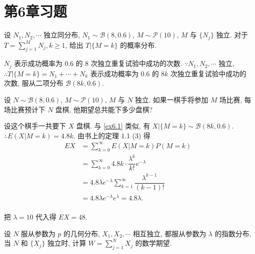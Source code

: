 \documentclass{ctexart}
\begin{document}
\section{第6章习题}
\addtocounter{exsection}{6}
\begin{exercise}[a]\label{ex6.1}
    设 $N_1,N_2,\cdots$ 独立同分布, $N_1\sim\mathcal{B}(8,0.6)$, $M\sim\mathcal{P}(10)$, $M$ 与 $\{N_j\}$ 独立. 对于 $T=\sum\limits_{j=1}^MN_j,k\geq1$, 给出 $T|\{M=k\}$ 的概率分布.
\end{exercise}
\begin{solution}
    $N_j$ 表示成功概率为 $0.6$ 的 $8$ 次独立重复试验中成功的次数. $\because N_1,N_2,\cdots$ 独立, $\therefore T|\{M=k\}=N_1+\cdots+N_k$ 表示成功概率为 $0.6$ 的 $8k$ 次独立重复试验中成功的次数, 服从二项分布 $\mathcal{B}(8k,0.6)$.
\end{solution}
\begin{exercise}%
    设 $N\sim\mathcal{B}(8,0.6)$, $M\sim\mathcal{P}(10)$, $M$ 与 $N$ 独立. 如果一棋手将参加 $M$ 场比赛, 每场比赛预计下 $N$ 盘棋, 他期望总共能下多少盘棋?
\end{exercise}
\begin{solution}
    设这个棋手一共要下 $X$ 盘棋. 与 \ref{ex6.1} 类似, 有 $X|\{M=k\}\sim\mathcal{B}(8k,0.6)$. $\therefore E(X|M=k)=4.8k$. 由书上的定理 1.1 (3) 得
    \begin{align*}
        EX & =\sum\limits_{k=0}^\infty E(X|M=k)P(M=k) \\
        & =\sum\limits_{k=0}^\infty4.8k\cdot\dfrac{\lambda^k}{k!}e^{-\lambda} \\
        & =4.8\lambda e^{-\lambda}\sum\limits_{k=1}^\infty\dfrac{\lambda^{k-1}}{(k-1)!} \\
        & =4.8\lambda e^{-\lambda}e^\lambda=4.8\lambda. \\
    \end{align*}

    把 $\lambda=10$ 代入得 $EX=48$.
\end{solution}
\begin{exercise}%
    设 $N$ 服从参数为 $p$ 的几何分布, $X_1,X_2,\cdots$ 相互独立, 都服从参数为 $\lambda$ 的指数分布, 当 $N$ 和 $\{X_j\}$ 独立时, 计算 $W=\sum\limits_{j=1}^NX_j$ 的数学期望.
\end{exercise}
\end{document}
